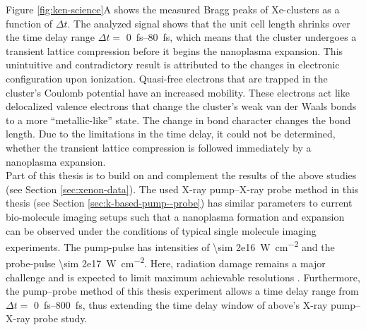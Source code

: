 Figure \ref{fig:ken-science}A shows the measured Bragg peaks of Xe-clusters as a function of $\Delta t$. The analyzed signal shows that the unit cell length shrinks over the time delay range $\Delta t =$ \SIrange{0}{80}{\femto\second}, which means that the cluster undergoes a transient lattice compression before it begins the nanoplasma expansion. This unintuitive and contradictory result is attributed to the changes in electronic configuration upon ionization. Quasi-free electrons that are trapped in the cluster's Coulomb potential have an increased mobility. These electrons act like delocalized valence electrons that change the cluster's weak van der Waals bonds to a more ``metallic-like'' state. The change in bond character changes the bond length. Due to the limitations in the time delay, it could not be determined, whether the transient lattice compression is followed immediately by a nanoplasma expansion.\\[1\baselineskip]
Part of this thesis is to build on and complement the results of the above studies (see Section \ref{sec:xenon-data}). The used X-ray pump--X-ray probe method in this thesis (see Section \ref{sec:k-based-pump--probe}) has similar parameters to current bio-molecule imaging setups such that a nanoplasma formation and expansion can be observed under the conditions of typical single molecule imaging experiments. The pump-pulse has intensities of \SI{\sim 2e16}{\watt\per\square\centi\meter} and the probe-pulse \SI{\sim 2e17}{\watt\per\square\centi\meter}. Here, radiation damage remains a major challenge and is expected to limit maximum achievable resolutions \cite{Aquila-2015-StrucDyn}. Furthermore, the pump--probe method of this thesis experiment allows a time delay range from $\Delta t=$ \SIrange{0}{800}{\femto\second}, thus extending the time delay window of above's X-ray pump--X-ray probe study.%
%
%
%
